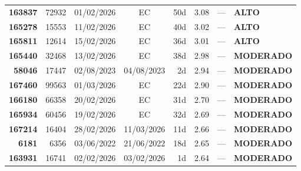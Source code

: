 \documentclass[a4paper,10pt]{article}
\begin{document}
\begin{center}
\begin{longtable}{>{\scriptsize}r>{\scriptsize}r>{\scriptsize}c>{\scriptsize}c>{\scriptsize}r>{\scriptsize}r>{\scriptsize}r>{\scriptsize}l}
\textcolor{anomorange}{\textbf{163837}} & 72932 & 01/02/2026 & \textcolor{anomorange}{EC} & 50d & \textcolor{anomorange}{3.08} & --- & \textcolor{anomorange}{\textbf{ALTO}} \\

\textcolor{anomorange}{\textbf{165278}} & 15553 & 11/02/2026 & \textcolor{anomorange}{EC} & 40d & \textcolor{anomorange}{3.02} & --- & \textcolor{anomorange}{\textbf{ALTO}} \\

\textcolor{anomorange}{\textbf{165811}} & 12614 & 15/02/2026 & \textcolor{anomorange}{EC} & 36d & \textcolor{anomorange}{3.01} & --- & \textcolor{anomorange}{\textbf{ALTO}} \\

\textcolor{anomyellow}{\textbf{165440}} & 32468 & 13/02/2026 & \textcolor{anomorange}{EC} & 38d & \textcolor{anomyellow}{2.98} & --- & \textcolor{anomyellow}{\textbf{MODERADO}} \\

\textcolor{anomyellow}{\textbf{58046}} & 17447 & 02/08/2023 & 04/08/2023 & 2d & \textcolor{anomyellow}{2.94} & --- & \textcolor{anomyellow}{\textbf{MODERADO}} \\

\textcolor{anomyellow}{\textbf{167460}} & 99563 & 01/03/2026 & \textcolor{anomorange}{EC} & 22d & \textcolor{anomyellow}{2.90} & --- & \textcolor{anomyellow}{\textbf{MODERADO}} \\

\textcolor{anomyellow}{\textbf{166180}} & 66358 & 20/02/2026 & \textcolor{anomorange}{EC} & 31d & \textcolor{anomyellow}{2.70} & --- & \textcolor{anomyellow}{\textbf{MODERADO}} \\

\textcolor{anomyellow}{\textbf{165934}} & 60456 & 19/02/2026 & \textcolor{anomorange}{EC} & 32d & \textcolor{anomyellow}{2.69} & --- & \textcolor{anomyellow}{\textbf{MODERADO}} \\

\textcolor{anomyellow}{\textbf{167214}} & 16404 & 28/02/2026 & 11/03/2026 & 11d & \textcolor{anomyellow}{2.66} & --- & \textcolor{anomyellow}{\textbf{MODERADO}} \\

\textcolor{anomyellow}{\textbf{6181}} & 6356 & 03/06/2022 & 21/06/2022 & 18d & \textcolor{anomyellow}{2.65} & --- & \textcolor{anomyellow}{\textbf{MODERADO}} \\

\textcolor{anomyellow}{\textbf{163931}} & 16741 & 02/02/2026 & 03/02/2026 & 1d & \textcolor{anomyellow}{2.64} & --- & \textcolor{anomyellow}{\textbf{MODERADO}} \\


\end{longtable}
\end{center}
\end{document}
